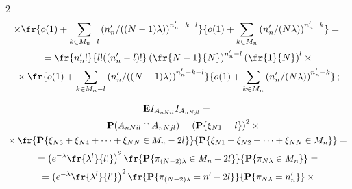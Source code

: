 \begin{multicols}{2}
\begin{multline*}
\times\fr {o(1)+\sum\limits_{k\in


M_n-l}\left({n'_n}/{((N-1)\lambda)}\right)^{n'_n-k-l}}{


o(1)+\sum\limits_{k\in M_n}\left({n'_n}/{(N\lambda)}\right)^{n'_n-k}} ={}\\[1pt]


{}=\fr{n'_n!}{l!((n'_n-l)!}\left(\fr{N-1}{N}\right)^{n'_n-l}\left(\fr{1}{N}\right)^{l}\times{}\\[1pt]


{}\times


\fr {o(1)+\sum\limits_{k\in M_n-l}\left({n'_n}/{((N-1)\lambda)}\right)^{n'_n-k-l}}{


o(1)+\sum\limits_{k\in M_n}\left({n'_n}/{(N\lambda)}\right)^{n'_n-k}}\,;


\end{multline*}





\vspace*{-6pt}





\noindent


\begin{multline*}


\mathbf{E} I_{A_{nNil}}I_{A_{nNjl}}={}\\[1pt]


{}=\mathbf{P}(A_{nNil}\cap A_{nNjl}) =


\left(\mathbf{P}\{\xi_{N1}=l\}\right)^2\times{}\\[1pt]


{}\times \fr{\mathbf{P}\{


 \xi_{N3}+\xi_{N4}+ \dots +\xi_{NN}\in M_n-2l\}}{\mathbf{P}\{


 \xi_{N1}+\xi_{N2}+ \dots +\xi_{NN}\in M_n\}}={}\\[1pt]


{}=


\left(e^{-\lambda}\fr{\lambda^l}{l!}\right)^2\fr{\mathbf{P}\{


\pi_{(N-2)\lambda}\in M_n-2l\}}{\mathbf{P}\{\pi_{N\lambda}\in M_n\}} ={}\\[1pt]


{}=


\left(e^{-\lambda}\fr{\lambda^l}{l!}\right)^2\fr{\mathbf{P}\{


\pi_{(N-2)\lambda}=n'-2l\}}{\mathbf{P}\{\pi_{N\lambda}=n'_n\}}\times{}\\[1pt]



\end{multline*}
\end{multicols}
